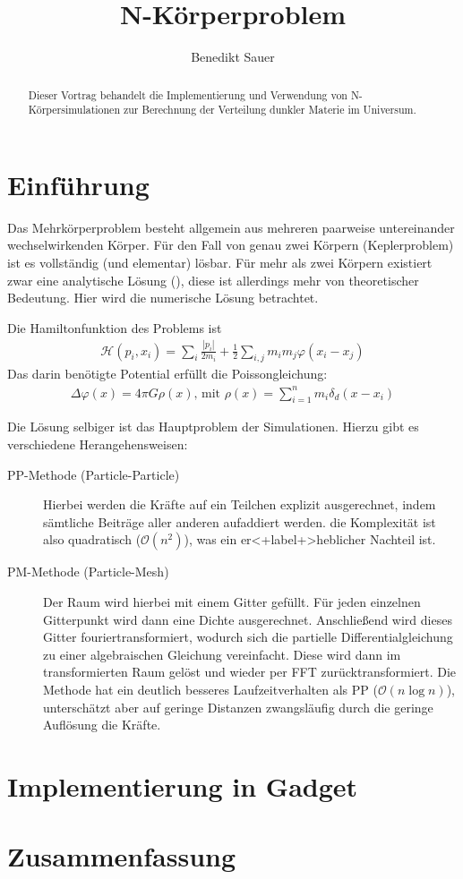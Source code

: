 \documentclass[a4paper]{scrartcl}
\author{Benedikt Sauer}
\title{N-Körperproblem}
\begin{document}
\maketitle
\begin{abstract}
  Dieser Vortrag behandelt die Implementierung und Verwendung von
  N-Körpersimulationen zur Berechnung der Verteilung dunkler Materie im
  Universum.
\end{abstract}
\section{Einführung}
Das Mehrkörperproblem besteht allgemein aus mehreren paarweise untereinander
wechselwirkenden Körper. Für den Fall von genau zwei Körpern (Keplerproblem) ist
es vollständig (und elementar) lösbar. Für mehr als zwei Körpern existiert zwar
eine analytische Lösung (\cite{wang}), diese ist allerdings mehr von
theoretischer Bedeutung. Hier wird die numerische Lösung betrachtet.

Die Hamiltonfunktion des Problems ist
\begin{align}
  \mathcal{H}(p_i, x_i) = \sum_i \frac{\left|p_i\right|}{2m_i} +
  \frac{1}{2} \sum_{i,j} m_i m_j \varphi(x_i - x_j)
  \label{eq:hamilton}
\end{align}
Das darin benötigte Potential erfüllt die Poissongleichung:
\begin{align}
  \Delta \varphi(x) = 4\pi G \rho(x)\text{, mit }\rho(x) = \sum_{i=1}^n m_i
  \delta_d(x - x_i)
  \label{eq:poisson}
\end{align}

Die Lösung selbiger ist das Hauptproblem der Simulationen. Hierzu gibt es
verschiedene Herangehensweisen:
\begin{description}
  \item[PP-Methode (Particle-Particle)]
    Hierbei werden die Kräfte auf ein Teilchen explizit ausgerechnet, indem
    sämtliche Beiträge aller anderen aufaddiert werden. die Komplexität ist also
    quadratisch ($\mathcal O(n^2)$), was ein er<+label+>heblicher Nachteil ist.
  \item[PM-Methode (Particle-Mesh)]
    Der Raum wird hierbei mit einem Gitter gefüllt. Für jeden einzelnen
    Gitterpunkt wird dann eine Dichte ausgerechnet. Anschließend wird dieses
    Gitter fouriertransformiert, wodurch sich die partielle
    Differentialgleichung zu einer algebraischen Gleichung vereinfacht. Diese
    wird dann im transformierten Raum gelöst und wieder per FFT
    zurücktransformiert. Die Methode hat ein deutlich besseres Laufzeitverhalten
    als PP ($\mathcal O(n\log n)$), unterschätzt aber auf geringe Distanzen
    zwangsläufig durch die geringe Auflösung die Kräfte.

\end{description}

\section{Implementierung in Gadget}


\section{Zusammenfassung}

\end{document}
